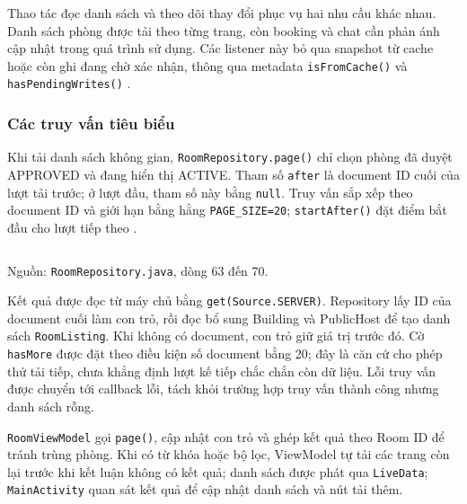 Thao tác đọc danh sách và theo dõi thay đổi phục vụ hai nhu cầu khác nhau. Danh sách phòng được tải theo từng trang, còn booking và chat cần phản ánh cập nhật trong quá trình sử dụng. Các listener này bỏ qua snapshot từ cache hoặc còn ghi đang chờ xác nhận, thông qua metadata \texttt{isFrom\allowbreak{}Cache()} và \texttt{hasPending\allowbreak{}Writes()} \parencite{firebase_listeners}.

\subsubsection{Các truy vấn tiêu biểu}

Khi tải danh sách không gian, \texttt{Room\allowbreak{}Repository.\allowbreak{}page()} chỉ chọn phòng đã duyệt APPROVED và đang hiển thị ACTIVE. Tham số \texttt{after} là document ID cuối của lượt tải trước; ở lượt đầu, tham số này bằng \texttt{null}. Truy vấn sắp xếp theo document ID và giới hạn bằng hằng \texttt{PAGE\_SIZE=20}; \texttt{start\allowbreak{}After()} đặt điểm bắt đầu cho lượt tiếp theo \parencite{firebase_queries,firebase_query_cursors}.

\par\medskip\noindent\begin{minipage}{\linewidth}
\inputminted[firstnumber=1]{java}{Resources/chapter4/code/room-query.java}
{\footnotesize\noindent Nguồn: \texttt{Room\allowbreak{}Repository.\allowbreak{}java}, dòng 63 đến 70.\par}
\end{minipage}\par\medskip

Kết quả được đọc từ máy chủ bằng \texttt{get(Source.\allowbreak{}SERVER)}. Repository lấy ID của document cuối làm con trỏ, rồi đọc bổ sung Building và PublicHost để tạo danh sách \texttt{Room\allowbreak{}Listing}. Khi không có document, con trỏ giữ giá trị trước đó. Cờ \texttt{hasMore} được đặt theo điều kiện số document bằng 20; đây là căn cứ cho phép thử tải tiếp, chưa khẳng định lượt kế tiếp chắc chắn còn dữ liệu. Lỗi truy vấn được chuyển tới callback lỗi, tách khỏi trường hợp truy vấn thành công nhưng danh sách rỗng.

\texttt{Room\allowbreak{}ViewModel} gọi \texttt{page()}, cập nhật con trỏ và ghép kết quả theo Room ID để tránh trùng phòng. Khi có từ khóa hoặc bộ lọc, ViewModel tự tải các trang còn lại trước khi kết luận không có kết quả; danh sách được phát qua \texttt{LiveData}; \texttt{Main\allowbreak{}Activity} quan sát kết quả để cập nhật danh sách và nút tải thêm.

